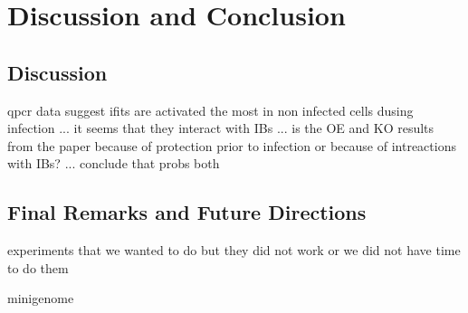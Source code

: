 \chapter{Discussion and Conclusion}
\section{Discussion}

qpcr data suggest ifits are activated the most in non infected cells dusing infection ... it seems that they interact with IBs ... is the OE and KO results from the paper because of protection prior to infection or because of intreactions with IBs? ... conclude that probs both




\section{Final Remarks and Future Directions}
experiments that we wanted to do but they did not work or we did not have time to do them

minigenome
